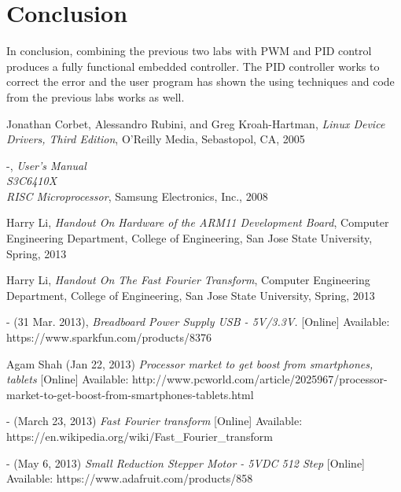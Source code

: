\documentclass[10pt,conference]{IEEEtran}
\begin{document}
%
%
\section{Conclusion}
In conclusion, combining the previous two labs with PWM and PID control produces a fully functional embedded controller. The PID controller works to correct the error and the user program has shown the using techniques and code from the previous labs works as well.

%
%
\begin{thebibliography}{9}
Jonathan Corbet, Alessandro Rubini, and Greg Kroah-Hartman,
\emph{Linux Device Drivers, Third Edition},
O'Reilly Media,
Sebastopol, CA,
2005

-,
\emph{User's Manual \\ S3C6410X \\ RISC Microprocessor},
Samsung Electronics, Inc.,
2008

Harry Li,
\emph{Handout On Hardware of the ARM11 Development Board},
Computer Engineering Department, College of Engineering,
 San Jose State University,
Spring, 2013

Harry Li,
\emph{Handout On The Fast Fourier Transform},
Computer Engineering Department, College of Engineering,
 San Jose State University,
Spring, 2013

- (31 Mar. 2013),
\emph{Breadboard Power Supply USB - 5V/3.3V.}
[Online]
Available: https://www.sparkfun.com/products/8376

Agam Shah (Jan 22, 2013)
\emph{Processor market to get boost from smartphones, tablets}
[Online]
Available: http://www.pcworld.com/article/2025967/processor-market-to-get-boost-from-smartphones-tablets.html

- (March 23, 2013)
\emph{Fast Fourier transform}
[Online]
Available: https://en.wikipedia.org/wiki/Fast\_Fourier\_transform

- (May 6, 2013)
\emph{Small Reduction Stepper Motor - 5VDC 512 Step}
[Online]
Available: https://www.adafruit.com/products/858

\end{thebibliography}
\end{document}
